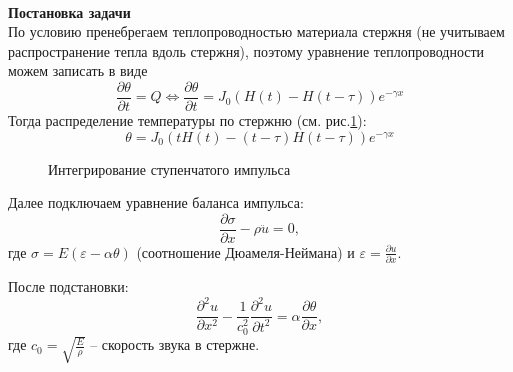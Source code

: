 \documentclass[a4paper, 11pt]{article}
\newcommand{\beq}{\begin{equation}}
\newcommand{\eeq}{\end{equation}}
\newenvironment{solution}
    {\textit{}}
    {}
\begin{document}
\begin{solution}\\
\textbf{Постановка задачи}\\

По условию пренебрегаем теплопроводностью материала стержня (не учитываем распространение тепла вдоль стержня), поэтому уравнение теплопроводности можем записать в виде
\beq
\frac{\partial\theta}{\partial t}=Q\Leftrightarrow\frac{\partial\theta}{\partial t}=J_0(H(t)-H(t-\tau))e^{-\gamma x}
\eeq
Тогда распределение температуры по стержню (см. рис.\ref{fig:integrate}):
\beq\label{Temperature}
\theta=J_0\left(tH(t)-(t-\tau)H(t-\tau)\right)e^{-\gamma x}
\eeq
\begin{figure}[h]
\centering
{}
\caption{Интегрирование ступенчатого импульса}
\label{fig:integrate}
\end{figure}


Далее подключаем уравнение баланса импульса:
\beq
\frac{\partial\sigma}{\partial x}-\rho\ddot{u}=0,
\eeq
где $\sigma=E\left(\varepsilon-\alpha\theta\right)$ (соотношение Дюамеля-Неймана) и $\displaystyle{}\varepsilon=\frac{\partial u}{\partial x}$.

После подстановки:
\beq
\frac{\partial^2u}{\partial x^2}-\frac{1}{c_0^2}\frac{\partial^2u}{\partial t^2}=\alpha\frac{\partial\theta}{\partial x},
\eeq
где $\displaystyle{}c_0=\sqrt{\frac{E}{\rho}}$ -- скорость звука в стержне.


\end{solution}
\end{document}
